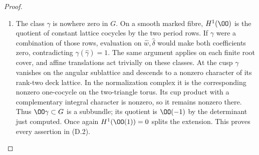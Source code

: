 \begin{proof}
\begin{enumerate}[label=\arabic*.,leftmargin=*]
\item The class $\gamma$ is nowhere zero in $G$. On a smooth marked fibre,
$H^1(\OO)$ is the quotient of constant lattice cocycles by the two
period rows. If $\gamma$ were a combination of those rows, evaluation
on $\widehat w,\widehat\delta$ would make both coefficients zero,
contradicting $\gamma(\widehat\gamma)=1$. The same argument applies
on each finite root cover, and affine translations act trivially on
these classes. At the cusp $\gamma$ vanishes on the angular sublattice
and descends to a nonzero character of its rank-two deck lattice.
In the normalization complex it is the corresponding nonzero
one-cocycle on the two-triangle torus. Its cup product with a complementary
integral character is nonzero, so it remains nonzero there. Thus
$\OO\gamma\subset G$ is a subbundle; its quotient is $\OO(-1)$ by
the determinant just computed. Once again $H^1(\OO(1))=0$ splits the
extension. This proves every assertion in (D.2).
\end{enumerate}
\end{proof}

